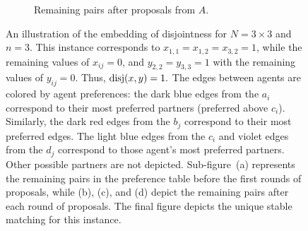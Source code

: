\begin{figure}[p]
\begin{subfigure}{0.45\textwidth}
\begin{center}
\begin{tikzpicture}
            \end{tikzpicture}
        \end{center}
        \caption{Remaining pairs after proposals from $A$.}
    \end{subfigure}
    \caption{An illustration of the embedding of disjointness for $N = 3 \times 3$ and $n = 3$. This instance corresponds to $x_{1,1} = x_{1,2} = x_{3, 2} = 1$, while the remaining values of $x_{ij} = 0$, and $y_{2,2} = y_{3,3} = 1$ with the remaining values of $y_{ij} = 0$. Thus, $\disj(x, y) = 1.$ The edges between agents are colored by agent preferences: the dark blue edges from the $a_i$ correspond to their most preferred partners (preferred above $c_i$). Similarly, the dark red edges from the $b_j$ correspond to their most preferred edges. The light blue edges from the $c_i$ and violet edges from the $d_j$ correspond to those agent's most preferred partners. Other possible partners are not depicted. Sub-figure~(a) represents the remaining pairs in the preference table before the first rounds of proposals, while (b), (c), and (d) depict the remaining pairs after each round of proposals. The final figure depicts the unique stable matching for this instance.}
    \label{fig:disjoint}
\end{figure}

